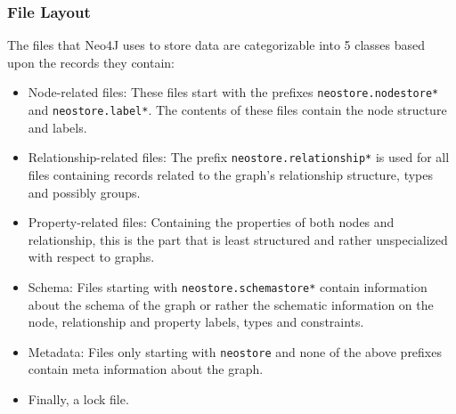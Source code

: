             \subsubsection{File Layout}\label{files_sec}
            The files that Neo4J uses to store data are categorizable into 5 classes based upon the records they contain:
            \begin{itemize}
                \item Node-related files: These files start with the prefixes \texttt{neostore.nodestore*} and \texttt{neostore.label*}. 
                    The contents of these files contain the node structure and labels. 
                \item Relationship-related files: The prefix \texttt{neostore.relationship*} is used for all files containing records related to the graph's relationship structure, types and possibly groups.
                \item Property-related files: Containing the properties of both nodes and relationship, this is the part that is least structured and rather unspecialized with respect to graphs.
                \item Schema: Files starting with \texttt{neostore.schemastore*} contain information about the schema of the graph or rather the schematic information on the node, relationship and property labels, types and constraints.
                \item Metadata: Files only starting with \texttt{neostore} and none of the above prefixes contain meta information about the graph.
                \item Finally, a lock file.
            \end{itemize}
            

